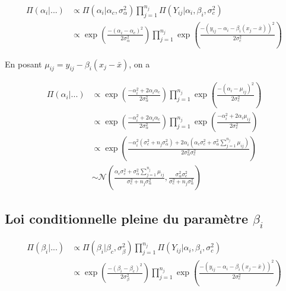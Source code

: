 \documentclass[
]{article}
\begin{document}
\begin{align*}
\Pi(\alpha_{i}|...) &\propto \Pi(\alpha_{i}|\alpha_{c},\sigma_{\alpha}^{2} ) \prod_{j=1}^{n_{j}} \Pi(Y_{ij}|\alpha_{i},\beta_{i},\sigma_{c}^{2} ) \\
        &\propto \exp\left(\frac{-(\alpha_{i}-\alpha_{c})^{2}}{2\sigma_{\alpha}^{2}}\right) \prod_{j=1}^{n_{j}} \exp\left(\frac{-(y_{ij}-\alpha_{i}-\beta_i(x_{j}-\bar{x}))^{2}}{2\sigma_{c}^{2}}\right) 
\end{align*}

En posant \(\mu_{ij} = y_{ij} - \beta_i(x_{j}-\bar{x})\), on a

\begin{align*}
\Pi(\alpha_{i}|...)&\propto \exp\left(\frac{-\alpha_i^2+2\alpha_i\alpha_c}{2\sigma_{\alpha}^{2}}\right) \prod_{j=1}^{n_{j}} \exp\left(\frac{-(\alpha_{i}-\mu_{ij})^{2}}{2\sigma_{c}^{2}}\right)  \\
        &\propto \exp\left(\frac{-\alpha_i^2+2\alpha_i\alpha_c}{2\sigma_{\alpha}^{2}}\right) \prod_{j=1}^{n_{j}} \exp\left(\frac{-\alpha_i^2+2\alpha_i\mu_{ij}}{2\sigma_{c}^{2}}\right)  \\
        &\propto \exp\left(\frac{-\alpha_i^2(\sigma_c^2+n_j\sigma_{\alpha}^2) +2\alpha_i(\alpha_c\sigma_c^2+\sigma_{\alpha}^2\sum\limits_{j=1}^{n_j} \mu_{ij})}{2\sigma_{\alpha}^{2}\sigma_c^2}\right)\\
        &\sim \mathcal{N}\left(\frac{\alpha_c\sigma_c^2+\sigma_{\alpha}^2\sum\limits_{j=1}^{n_j} \mu_{ij}}{\sigma_c^2+n_j\sigma_{\alpha}^2},\frac{\sigma_{\alpha}^{2}\sigma_c^2}{\sigma_c^2+n_j\sigma_{\alpha}^2}\right)
\end{align*}

\hypertarget{loi-conditionnelle-pleine-du-paramuxe8tre-beta_i}{%
\subsection{\texorpdfstring{Loi conditionnelle pleine du paramètre
\(\beta_i\)}{Loi conditionnelle pleine du paramètre \textbackslash beta\_i}}\label{loi-conditionnelle-pleine-du-paramuxe8tre-beta_i}}

\begin{align*}
\Pi(\beta_{i}|...) &\propto \Pi(\beta_{i}|\beta_{c},\sigma_{\beta}^{2} ) \prod_{j=1}^{n_{j}} \Pi(Y_{ij}|\alpha_{i},\beta_{i},\sigma_{c}^{2} ) \\
        &\propto \exp\left(\frac{-(\beta_{i}-\beta_{c})^{2}}{2\sigma_{\beta}^{2}}\right) \prod_{j=1}^{n_{j}} \exp\left(\frac{-(y_{ij}-\alpha_{i}-\beta_i(x_{j}-\bar{x}))^{2}}{2\sigma_{c}^{2}}\right) 
\end{align*}
\end{document}
